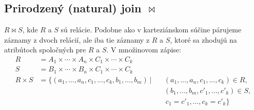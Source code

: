 \subsection*{\textbf{Prirodzený (natural) join $\Join$}} $R \Join S$, kde $R$ a $S$ sú relácie.
Podobne ako v karteziánskom súčine párujeme záznamy z dvoch relácií, ale iba tie záznamy z $R$ a
$S$, ktoré sa zhodujú na atribútoch spoločných pre $R$ a $S$. V množinovom zápise:
    \begin{align*}
        R          &= A_1 \times \cdots \times A_n \times C_1 \times \cdots \times C_k\\
        S          &= B_1 \times \cdots \times B_n \times C_1 \times \cdots \times C_k\\
        R \times S &= \{(a_1, \dots, a_n, c_1, \dots, c_k, b_1, \dots, b_m) \, | \, &&(a_1, \dots, a_n, c_1, \dots, c_k) \in R, \\
        &                                                                &&(b_1, \dots, b_m, c'_1, \dots, c'_k) \in S, \\
        &                                                                &&\ c_1 = c'_1, \dots, c_k = c'_k\}
    \end{align*}
